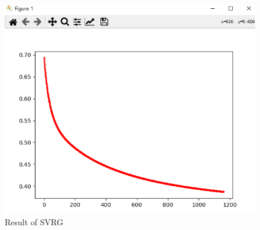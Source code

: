 \documentclass{xjtureport}
\begin{document}
\begin{figure}[H]
    \centering
    \includegraphics[scale = 0.4]{SVRG.png}
    \caption{Result of SVRG}
    \end{figure}
\end{document}
